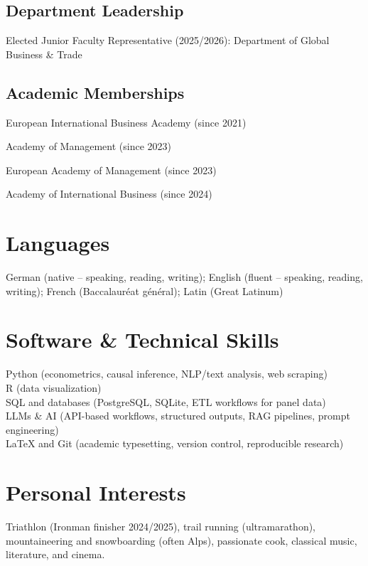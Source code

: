 \documentclass[11pt,a4paper]{article}
\begin{document}
\begin{cv}
\subsection{Department Leadership}
\begin{cvlist}{}
\item Elected Junior Faculty Representative (2025/2026): Department of Global Business \& Trade
\end{cvlist}

\subsection{Academic Memberships}
\begin{cvlist}{}
\item European International Business Academy (since 2021)
\item Academy of Management (since 2023)
\item European Academy of Management (since 2023)
\item Academy of International Business (since 2024)
\end{cvlist}

\section{Languages}
German (native -- speaking, reading, writing); English (fluent -- speaking, reading, writing); French (Baccalauréat général); Latin (Great Latinum)

\section{Software \& Technical Skills}
Python (econometrics, causal inference, NLP/text analysis, web scraping)\\
R (data visualization)\\
SQL and databases (PostgreSQL, SQLite, ETL workflows for panel data)\\
LLMs \& AI (API-based workflows, structured outputs, RAG pipelines, prompt engineering)\\
\LaTeX{} and Git (academic typesetting, version control, reproducible research)

\section{Personal Interests}
Triathlon (Ironman finisher 2024/2025), trail running (ultramarathon), mountaineering and snowboarding (often Alps), passionate cook, classical music, literature, and cinema.


\end{cv}
\end{document}
